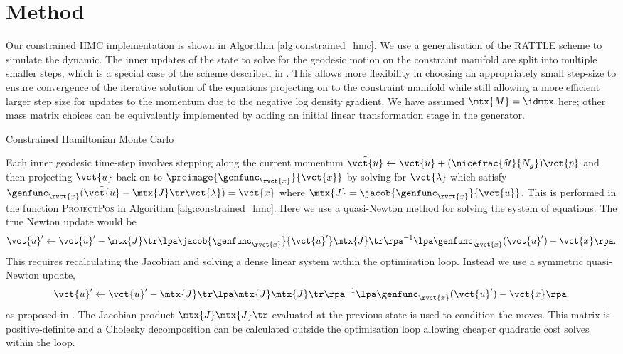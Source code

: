 \section{Method}\label{sec:method}

Our constrained \ac{HMC} implementation is shown in Algorithm \ref{alg:constrained_hmc}. We use a generalisation of the RATTLE scheme to simulate the dynamic. The inner updates of the state to solve for the geodesic motion on the constraint manifold are split into multiple smaller steps, which is a special case of the scheme described in \citep{leimkuhler2016efficient}. This allows more flexibility in choosing an appropriately small step-size to ensure convergence of the iterative solution of the equations projecting on to the constraint manifold while still allowing a more efficient larger step size for updates to the momentum due to the negative log density gradient. We have assumed $\mtx{M} = \idmtx$ here; other mass matrix choices can be equivalently implemented by adding an initial linear transformation stage in the generator.

\begin{algorithm}[!t]
\caption{Constrained Hamiltonian Monte Carlo}
\label{alg:constrained_hmc}
{
\small

}
\end{algorithm}

Each inner geodesic time-step involves stepping along the current momentum  $\tilde{\vct{u}} \gets \vct{u} + (\nicefrac{\delta t}{N_g}) \vct{p}$ and then projecting $\tilde{\vct{u}}$ back on to $\preimage{\genfunc_{\rvct{x}}}{\vct{x}}$ by solving for $\vct{\lambda}$ which satisfy $\genfunc_{\rvct{x}}(\tilde{\vct{u}} - \mtx{J}\tr\vct{\lambda}) = \vct{x}$ where $\mtx{J} = \jacob{\genfunc_{\rvct{x}}}{\vct{u}}$. This is performed in the function \textsc{ProjectPos} in Algorithm \ref{alg:constrained_hmc}. Here we use a quasi-Newton method for solving the system of equations. The true Newton update would be
\begin{equation}\label{eq:newton-iteration}
    \vct{u}'\gets \vct{u}' - 
    \mtx{J}\tr
    \lpa 
        \jacob{\genfunc_{\rvct{x}}}{\vct{u}'}\mtx{J}\tr
    \rpa^{-1}
    \lpa \genfunc_{\rvct{x}}(\vct{u}') - \vct{x} \rpa.
\end{equation}
This requires recalculating the Jacobian and solving a dense linear system within the optimisation loop. Instead we use a symmetric quasi-Newton update, 
\begin{equation}\label{eq:quasi-newton-iteration}
    \vct{u}'\gets \vct{u}' - 
    \mtx{J}\tr
    \lpa 
        \mtx{J}\mtx{J}\tr
    \rpa^{-1}
    \lpa \genfunc_{\rvct{x}}(\vct{u}') - \vct{x} \rpa.
\end{equation}
as proposed in \citep{barth1995algorithms}. The Jacobian product $\mtx{J}\mtx{J}\tr$ evaluated at the previous state is used to condition the moves. This matrix is positive-definite and a Cholesky decomposition can be calculated outside the optimisation loop allowing cheaper quadratic cost solves within the loop. 

